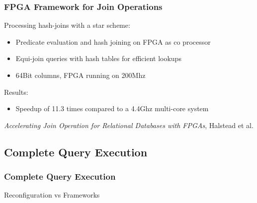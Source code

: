 \documentclass{beamer}
\begin{document}

\begin{frame}
	\frametitle{FPGA Framework for Join Operations}
	Processing hash-joins with a star scheme:
	\begin{itemize}
		\item Predicate evaluation and hash joining on FPGA as co processor
		\item Equi-join queries with hash tables for efficient lookups
		\item 64Bit columns, FPGA running on 200Mhz 
	\end{itemize}
	Results:
	\begin{itemize}
		\item Speedup of 11.3 times compared to a 4.4Ghz multi-core system
	\end{itemize}
	\begin{center}
		\small \emph{Accelerating Join Operation for Relational Databases with FPGAs}, Halstead et al.
	\end{center}
\end{frame}

\subsection{Complete Query Execution}
\begin{frame}
	\frametitle{Complete Query Execution}
	\begin{center}
		\huge{Reconfiguration vs Frameworks}
	\end{center}
	
\end{frame}
\end{document}
